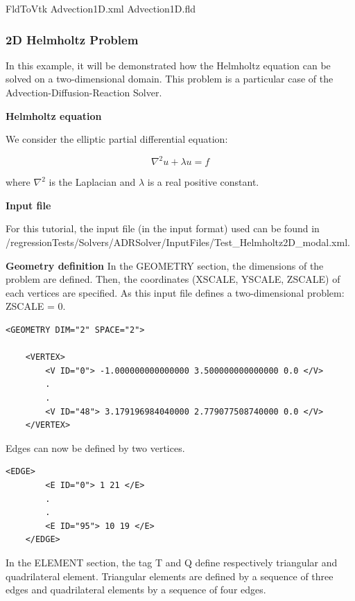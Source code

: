 FldToVtk Advection1D.xml Advection1D.fld



\subsubsection{2D Helmholtz Problem}

In this example, it will be demonstrated how the Helmholtz equation can be solved on a two-dimensional domain. 
This problem is a particular case of the Advection-Diffusion-Reaction Solver.

\textbf{Helmholtz equation}

We consider the elliptic partial differential equation:

\begin{equation}
\nabla^2 u  + \lambda u =  f
\end{equation}

where $\nabla^2$ is the Laplacian and $\lambda$ is a real positive constant.

\textbf{Input file} 

For this tutorial, the input file (in the \nekpp input format) used can be found
 in  \nekpp/regressionTests/Solvers/ADRSolver/InputFiles/Test\_Helmholtz2D\_modal.xml.

\textbf{\footnotesize{Geometry definition}}
In the GEOMETRY section, the dimensions of the problem are defined. 
Then, the coordinates (XSCALE, YSCALE, ZSCALE) of each vertices are specified. As this input file defines a two-dimensional problem: ZSCALE = 0.

\begin{lstlisting}[style=XMLStyle]
<GEOMETRY DIM="2" SPACE="2">

    <VERTEX>
        <V ID="0"> -1.000000000000000 3.500000000000000 0.0 </V>
        .
        .
        <V ID="48"> 3.179196984040000 2.779077508740000 0.0 </V>
    </VERTEX>
\end{lstlisting}

Edges can now be defined by two vertices.

\begin{lstlisting}[style=XMLStyle]
 <EDGE>
        <E ID="0"> 1 21 </E>
        .
        .
        <E ID="95"> 10 19 </E>
    </EDGE>
\end{lstlisting}

In the ELEMENT section, the tag T and Q define respectively triangular and quadrilateral element.
 Triangular elements are defined by a sequence of three edges and quadrilateral elements by a sequence of four edges.

